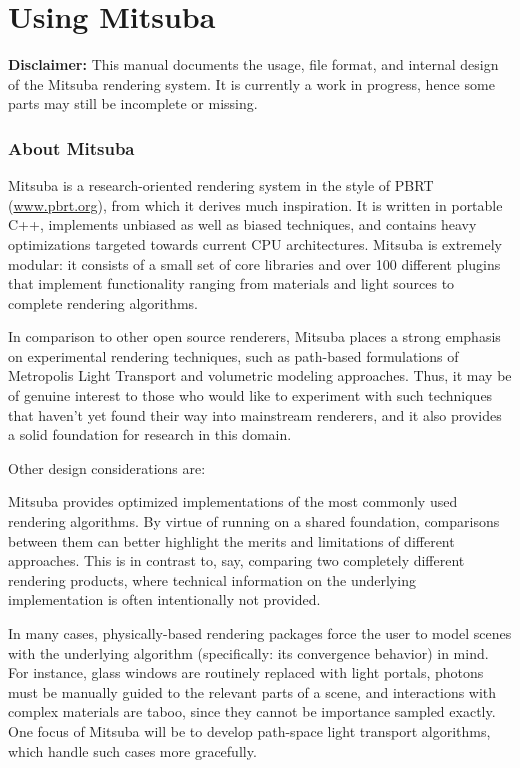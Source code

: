 \part{Using Mitsuba}
\textbf{Disclaimer:} This manual documents the usage, file format, and
internal design of the Mitsuba rendering system. It is currently a work
in progress, hence some parts may still be incomplete or missing.

\section{About Mitsuba}
Mitsuba is a research-oriented rendering system in the style of PBRT
(\url{www.pbrt.org}), from which it derives much inspiration.
It is written in portable C++, implements unbiased as well
as biased techniques, and contains heavy optimizations targeted
towards current CPU architectures.
Mitsuba is extremely modular: it consists of a small set of core libraries
and over 100 different plugins that implement functionality ranging
from materials and light sources to complete rendering algorithms.

In comparison to other open source renderers, Mitsuba places a strong
emphasis on experimental rendering techniques, such as path-based
formulations of Metropolis Light Transport and volumetric
modeling approaches. Thus, it may be of genuine interest to those who
would like to experiment with such techniques that haven't yet found
their way into mainstream renderers, and it also provides a solid
foundation for research in this domain.

Other design considerations are:

Mitsuba provides optimized implementations of the most commonly
used rendering algorithms. By virtue of running on a shared foundation, comparisons between them can
better highlight the merits and limitations of different approaches. This is in contrast to, say,
comparing two completely different rendering products, where technical information on the underlying
implementation is often intentionally not provided.

In many cases, physically-based rendering packages force the user to model scenes with the underlying
algorithm (specifically: its convergence behavior) in mind. For instance, glass windows are routinely
replaced with light portals, photons must be manually guided to the relevant parts of a scene, and
interactions with complex materials are taboo, since they cannot be importance sampled exactly.
One focus of Mitsuba will be to develop path-space light transport algorithms, which handle such
cases more gracefully.

